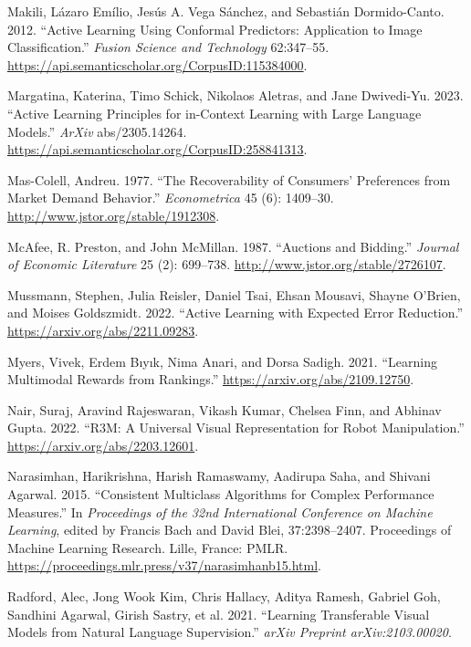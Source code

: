 \documentclass[
  letterpaper,
  DIV=11,
  numbers=noendperiod,
  oneside]{scrreprt}
\newlength{\cslhangindent}
\newenvironment{CSLReferences}[2] %
 {\begin{list}{}{%
  \setlength{\itemindent}{0pt}
  \setlength{\leftmargin}{0pt}
  \setlength{\parsep}{0pt}
  \ifodd #1
   \setlength{\leftmargin}{\cslhangindent}
   \setlength{\itemindent}{-1\cslhangindent}
  \fi
  \setlength{\itemsep}{#2\baselineskip}}}
 {\end{list}}
\theoremstyle{remark}
\begin{document}
\begin{CSLReferences}{1}{0}
Makili, Lázaro Emílio, Jesús A. Vega Sánchez, and Sebastián
Dormido-Canto. 2012. {``Active Learning Using Conformal Predictors:
Application to Image Classification.''} \emph{Fusion Science and
Technology} 62:347--55.
\url{https://api.semanticscholar.org/CorpusID:115384000}.

Margatina, Katerina, Timo Schick, Nikolaos Aletras, and Jane Dwivedi-Yu.
2023. {``Active Learning Principles for in-Context Learning with Large
Language Models.''} \emph{ArXiv} abs/2305.14264.
\url{https://api.semanticscholar.org/CorpusID:258841313}.

Mas-Colell, Andreu. 1977. {``The Recoverability of Consumers'
Preferences from Market Demand Behavior.''} \emph{Econometrica} 45 (6):
1409--30. \url{http://www.jstor.org/stable/1912308}.

McAfee, R. Preston, and John McMillan. 1987. {``Auctions and Bidding.''}
\emph{Journal of Economic Literature} 25 (2): 699--738.
\url{http://www.jstor.org/stable/2726107}.

Mussmann, Stephen, Julia Reisler, Daniel Tsai, Ehsan Mousavi, Shayne
O'Brien, and Moises Goldszmidt. 2022. {``Active Learning with Expected
Error Reduction.''} \url{https://arxiv.org/abs/2211.09283}.

Myers, Vivek, Erdem Bıyık, Nima Anari, and Dorsa Sadigh. 2021.
{``Learning Multimodal Rewards from Rankings.''}
\url{https://arxiv.org/abs/2109.12750}.

Nair, Suraj, Aravind Rajeswaran, Vikash Kumar, Chelsea Finn, and Abhinav
Gupta. 2022. {``R3M: A Universal Visual Representation for Robot
Manipulation.''} \url{https://arxiv.org/abs/2203.12601}.

Narasimhan, Harikrishna, Harish Ramaswamy, Aadirupa Saha, and Shivani
Agarwal. 2015. {``Consistent Multiclass Algorithms for Complex
Performance Measures.''} In \emph{Proceedings of the 32nd International
Conference on Machine Learning}, edited by Francis Bach and David Blei,
37:2398--2407. Proceedings of Machine Learning Research. Lille, France:
PMLR. \url{https://proceedings.mlr.press/v37/narasimhanb15.html}.

Radford, Alec, Jong Wook Kim, Chris Hallacy, Aditya Ramesh, Gabriel Goh,
Sandhini Agarwal, Girish Sastry, et al. 2021. {``Learning Transferable
Visual Models from Natural Language Supervision.''} \emph{arXiv Preprint
arXiv:2103.00020}.


\end{CSLReferences}
\end{document}
